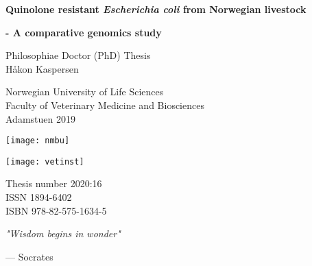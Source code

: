 \frontmatter
{}
{
\pagestyle{empty}
\graphicspath{ {./images/pdfs/} }
\begin{titlepage}
   \begin{center}
       
       \huge
       
       \textbf{Quinolone resistant \textit{Escherichia coli} from Norwegian livestock}
       
       \LARGE
       
       \textbf{- A comparative genomics study}
 
       \vspace{1cm}
       
       \large
       Philosophiae Doctor (PhD) Thesis\\
       Håkon Kaspersen
 
       \vspace{1.5cm}
       
       Norwegian University of Life Sciences\\
       Faculty of Veterinary Medicine and Biosciences\\
       Adamstuen 2019
       
       \texttt{[image: nmbu]}
       
       \texttt{[image: vetinst]}
       
       \vfill

 
       \vspace{0.5cm}
       \normalsize
 
       Thesis number 2020:16\\
       ISSN 1894-6402\\
       ISBN 978-82-575-1634-5
 
   \end{center}
\end{titlepage}

\begin{titlepage}
   \null
   \vspace*{\fill}
   \renewcommand{\epigraphsize}{\large}
   \epigraph{\textit{"Wisdom begins in wonder"}}{--- \textup{Socrates}}
\end{titlepage}
}